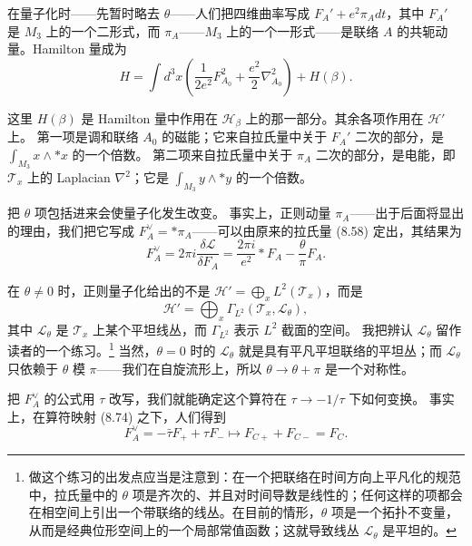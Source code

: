 在量子化时——先暂时略去 $\theta$——人们把四维曲率写成 $F_{A}'+e^{2}\pi_{A}dt$，其中 $F_{A}'$ 是 $M_{3}$ 上的一个二形式，而 $\pi_{A}$——$M_{3}$ 上的一个一形式——是联络 $A$ 的共轭动量。Hamilton 量成为
\begin{equation}
  \tag{8.78}
  \label{eq:8-78}
  H=\int d^{3}x\left(\frac{1}{2e^{2}}F_{A_{0}}^{2}+\frac{e^{2}}{2}\nabla_{A_{0}}^{2}\right)+H(\beta).
\end{equation}

这里 $H(\beta)$ 是 Hamilton 量中作用在 $\mathcal{H}_{\beta}$ 上的那一部分。其余各项作用在 $\mathcal{H}'$ 上。
第一项是调和联络 $A_{0}$ 的磁能；它来自拉氏量中关于 $F_{A}'$ 二次的部分，是 $\int_{M_{3}}x\wedge *x$ 的一个倍数。
第二项来自拉氏量中关于 $\pi_{A}$ 二次的部分，是电能，即 $\mathcal{T}_{x}$ 上的 Laplacian $\nabla^{2}$；它是 $\int_{M_{3}}y\wedge *y$ 的一个倍数。

把 $\theta$ 项包括进来会使量子化发生改变。
事实上，正则动量 $\pi_{A}$——出于后面将显出的理由，我们把它写成 $F_{A}^{\vee}=*\pi_{A}$——可以由原来的拉氏量 (8.58) 定出，其结果为
\begin{equation}
  \tag{8.79}
  \label{eq:8-79}
  F_{A}^{\vee}=2\pi i\frac{\delta\mathcal{L}}{\delta F_{A}}=\frac{2\pi i}{e^{2}}*F_{A}-\frac{\theta}{\pi}F_{A}.
\end{equation}

在 $\theta\ne0$ 时，正则量子化给出的不是 $\mathcal{H}'=\bigoplus_{x}L^{2}(\mathcal{T}_{x})$，而是
\begin{equation}
  \tag{8.80}
  \label{eq:8-80}
  \mathcal{H}'=\bigoplus_{x}\Gamma_{L^{2}}(\mathcal{T}_{x},\mathscr{L}_{\theta}),
\end{equation}
其中 $\mathscr{L}_{\theta}$ 是 $\mathcal{T}_{x}$ 上某个平坦线丛，而 $\Gamma_{L^{2}}$ 表示 $L^{2}$ 截面的空间。
我把辨认 $\mathscr{L}_{\theta}$ 留作读者的一个练习。\footnote{做这个练习的出发点应当是注意到：在一个把联络在时间方向上平凡化的规范中，拉氏量中的 $\theta$ 项是齐次的、并且对时间导数是线性的；任何这样的项都会在相空间上引出一个带联络的线丛。在目前的情形，$\theta$ 项是一个拓扑不变量，从而是经典位形空间上的一个局部常值函数；这就导致线丛 $\mathscr{L}_{\theta}$ 是平坦的。}
当然，$\theta=0$ 时的 $\mathscr{L}_{\theta}$ 就是具有平凡平坦联络的平坦丛；而 $\mathscr{L}_{\theta}$ 只依赖于 $\theta$ 模 $\pi$——我们在自旋流形上，所以 $\theta\to\theta+\pi$ 是一个对称性。

把 $F_{A}^{\vee}$ 的公式用 $\tau$ 改写，我们就能确定这个算符在 $\tau\to-1/\tau$ 下如何变换。
事实上，在算符映射 (8.74) 之下，人们得到
\begin{equation}
  \tag{8.81}
  \label{eq:8-81}
  F_{A}^{\vee}=-\bar\tau F_{+}+\tau F_{-}\mapsto F_{C+}+F_{C-}=F_{C}.
\end{equation}

